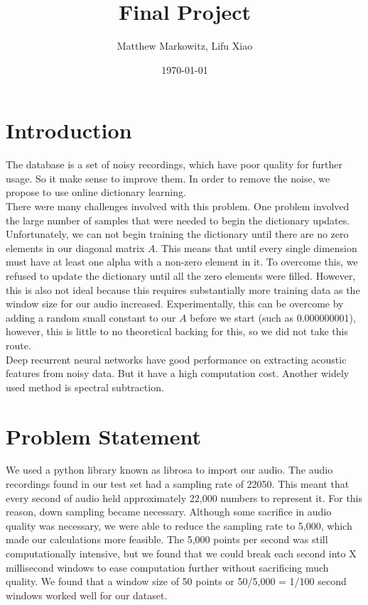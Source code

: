 \documentclass[UTF8]{article}
\title{Final Project}
\author{Matthew Markowitz, Lifu Xiao}
\date{\today}
\begin{document}
\maketitle


\section{Introduction}
The database is a set of noisy recordings, which have poor quality for further usage. So it make sense  to improve them. In order to remove the noise, we propose to use online dictionary learning.\\

There were many challenges involved with this problem. One problem involved the large number of samples that were needed to begin the dictionary updates. Unfortunately, we can not begin training the dictionary until there are no zero elements in our diagonal matrix $A$. This means that until every single dimension must have at least one alpha with a non-zero element in it. To overcome this, we refused to update the dictionary until all the zero elements were filled. However, this is also not ideal because this requires substantially more training data as the window size for our audio increased. Experimentally, this can be overcome by adding a random small constant to our $A$ before we start (such as 0.000000001), however, this is little to no theoretical backing for this, so we did not take this route.\\

Deep recurrent neural networks\cite{valentini2016speech} have good performance on extracting acoustic features from noisy data. But it have a high computation cost. Another widely used method is spectral subtraction.

\section{Problem Statement}
We used a python library known as librosa to import our audio\cite{valentini2016speech}. The audio recordings found in our test set had a sampling rate of 22050. This meant that every second of audio held approximately 22,000 numbers to represent it. For this reason, down sampling became necessary. Although some sacrifice in audio quality was necessary, we were able to reduce the sampling rate to 5,000, which made our calculations more feasible. The 5,000 points per second was still computationally intensive, but we found that we could break each second into X millisecond windows to ease computation further without sacrificing much quality. We found that a window size of 50 points or 50/5,000 = 1/100 second windows worked well for our dataset.
\end{document}
